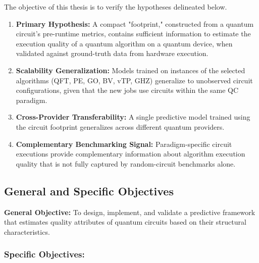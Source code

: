 \documentclass{article}
\begin{document}
The objective of this thesis is to verify the hypotheses delineated below.

\begin{enumerate}[label=H\arabic*, ref=H\arabic*, font=\bfseries]
\item \textbf{Primary Hypothesis:} A compact "footprint," constructed from a quantum circuit's pre-runtime metrics, contains sufficient information to estimate the execution quality of a quantum algorithm on a quantum device, when validated against ground-truth data from hardware execution.
\label{h:1}

\item \textbf{Scalability Generalization:} Models trained on instances of the selected algorithms (QFT, PE, GO, BV, vTP, GHZ) generalize to unobserved circuit configurations, given that the new jobs use circuits within the same QC paradigm.
\label{h:2}

\item \textbf{Cross-Provider Transferability:} A single predictive model trained using the circuit footprint generalizes across different quantum providers.
\label{h:3}

\item \textbf{Complementary Benchmarking Signal:} Paradigm-specific circuit executions provide complementary information about algorithm execution quality that is not fully captured by random-circuit benchmarks alone.
\label{h:4}
\end{enumerate}

\subsection{General and Specific Objectives}

\textbf{General Objective:} To design, implement, and validate a predictive framework that estimates quality attributes of quantum circuits based on their structural characteristics.

\subsubsection{Specific Objectives:}
\end{document}
